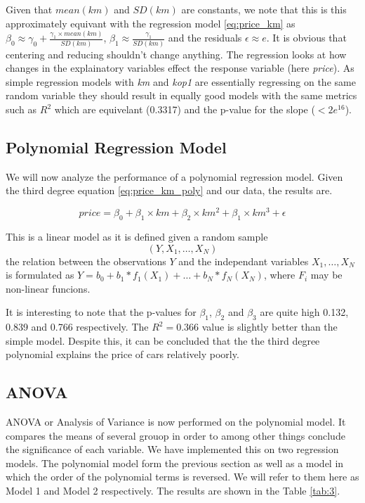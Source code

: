 \noindent
Given that $mean(km)$ and $SD(km)$ are constants, we note that this is this approximately equivant with the regression model \ref{eq:price_km} as $\beta_0 \approx \gamma_0 + \frac{\gamma_1 \times mean(km)}{SD(km)}$, $\beta_1 \approx \frac{\gamma_1}{SD(km)}$ and the residuals $\epsilon \approx e$. It is obvious that centering and reducing shouldn't change anything. The regression looks at how changes in the explainatory variables effect the response variable (here \textit{price}). As simple regression models with \textit{km} and \textit{kop1} are essentially regressing on the same random variable they should result in equally good models with the same metrics such as $R^2$ which are equivelant (0.3317) and the p-value for the slope ($<2e^{16}$).


\subsection{Polynomial Regression Model} %
\label{sub:poly_km}

We will now analyze the performance of a polynomial regression model. Given the third degree equation \ref{eq:price_km_poly} and our data, the results are. 

\begin{equation}\label{eq:price_km_poly}
	price = \beta_0 + \beta_1 \times km + \beta_2 \times km^2 + \beta_1 \times km^3 
	+ \epsilon
\end{equation}

\noindent
This is a linear model as it is defined given a random sample $$(Y,X_1,\ldots,X_N)$$ the relation between the observations $Y$ and the independant variables $X_1,\ldots,X_N$ is formulated as $Y = b_0 + b_1*f_1(X_1) + \ldots + b_N*f_N(X_N)$, where $F_i$ may be non-linear funcions.

\noindent
It is interesting to note that the p-values for $\beta_1$, $\beta_2$ and $\beta_3$ are quite high 0.132, 0.839 and 0.766 respectively. The $R^2 = 0.366$ value is slightly better than the simple model. Despite this, it can be concluded that the the third degree polynomial explains the price of cars relatively poorly.

\subsection{ANOVA} %
\label{sub:anova}

ANOVA or Analysis of Variance is now performed on the polynomial model. It compares the means of several grouop in order to among other things conclude the significance of each variable. We have implemented this on two regression models. The polynomial model form the previous section as well as a model in which the order of the polynomial terms is reversed. We will refer to them here as Model 1 and Model 2 respectively. The results are shown in the Table \ref{tab:3}.

